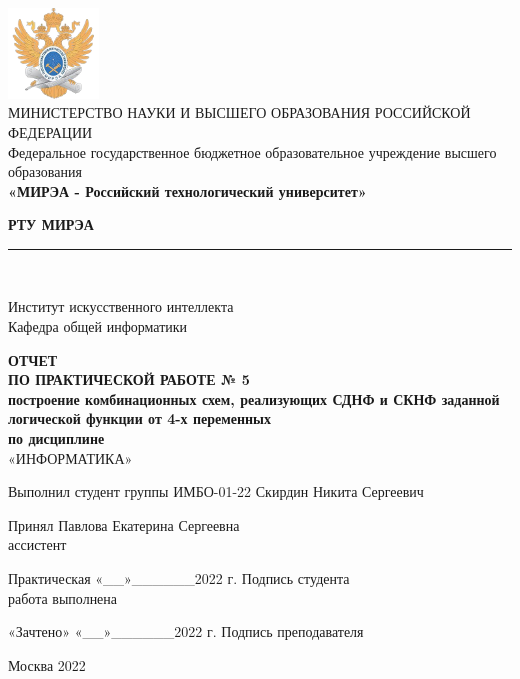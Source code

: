 \documentclass[14pt, a4paper]{extreport}
\newcommand{\doublerule}[1][.4pt]{%
	\noindent
	\makebox[0pt][l]{\rule[.6ex]{\linewidth}{#1}}%
	\rule[.3ex]{\linewidth}{#1}
}
\begin{document}
\begin{titlepage}
	\begin{center}
		\vspace*{0.5mm}

		\includegraphics[width=0.18\textwidth]{logo}\\
		\footnotesize
		МИНИСТЕРСТВО НАУКИ И ВЫСШЕГО ОБРАЗОВАНИЯ РОССИЙСКОЙ ФЕДЕРАЦИИ\\
		\small
		Федеральное государственное бюджетное образовательное учреждение высшего образования\\
		\textbf{«МИРЭА - Российский технологический университет»}
		\vspace{0.5cm}

		\large \textbf{РТУ МИРЭА} \normalsize

		\doublerule[1pt]\\
		\vspace{0.4cm}

		Институт искусственного интеллекта\\
		Кафедра общей информатики
		\vspace{1.5cm}

		\textbf{ОТЧЕТ}\\
		\textbf{ПО ПРАКТИЧЕСКОЙ РАБОТЕ № 5}\\
		\textbf{построение комбинационных схем, реализующих СДНФ и СКНФ заданной логической функции от 4-х переменных}\\
		\textbf{по дисциплине}\\
		«ИНФОРМАТИКА»
		\vspace{1.5cm}

		\small
		Выполнил студент группы ИМБО-01-22 \hfill Скирдин Никита Сергеевич
		\vspace{1cm}

		Принял \hfill Павлова Екатерина Сергеевна\\
		ассистент \hfill
		\vspace{1.5cm}

		\footnotesize
		\hspace{0.5cm} Практическая \hfill «\_\_»\_\_\_\_\_\_2022 г. \hfill Подпись студента\\
		\hspace{0.5cm} работа выполнена \hfill
		\vspace{0.5cm}

		\hspace{2cm} «Зачтено» \hfill «\_\_»\_\_\_\_\_\_2022 г. \hfill Подпись преподавателя
		\vfill

		\small
		Москва 2022
	\end{center}
	\thispagestyle{empty}
\end{titlepage}
\end{document}
